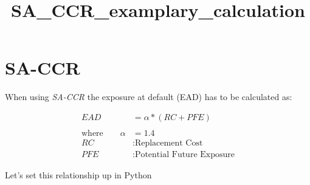\documentclass[11pt]{article}
\title{SA\_CCR\_examplary\_calculation}
\begin{document}
    
    \maketitle
    
    

    
    \hypertarget{sa-ccr}{%
\section{SA-CCR}\label{sa-ccr}}

    When using \emph{SA-CCR} the exposure at default (EAD) has to be
calculated as:

\begin{align*}
EAD &= \alpha * (RC + PFE)\\
\\
\text{where} \qquad \alpha&=1.4 \\
RC&: \text{Replacement Cost} \\
PFE&: \text{Potential Future Exposure}
\end{align*}

Let's set this relationship up in Python
\end{document}
